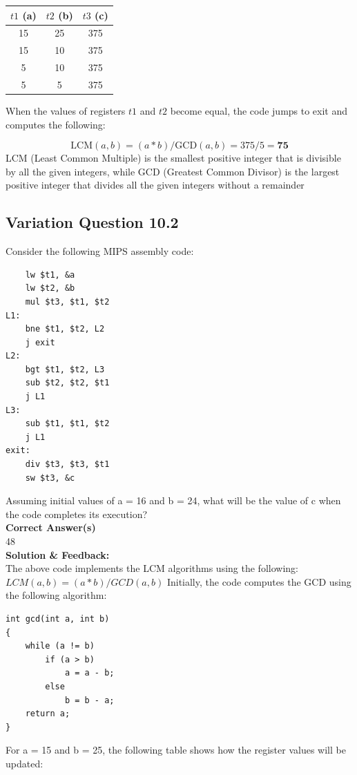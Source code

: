 \begin{center}
\begin{tabular}{|c|c|c|}
\hline
$t1$ (a) & $t2$ (b) & $t3$ (c) \\
\hline
15 & 25 & 375 \\
15 & 10 & 375 \\
5  & 10 & 375 \\
5  & 5  & 375 \\
\hline
\end{tabular}
\end{center}

When the values of registers $t1$ and $t2$ become equal, the code jumps to exit and computes the following:

\[
\text{LCM} (a, b) = (a * b) / \text{GCD} (a, b) = 375 / 5 = \mathbf{75}
\]
LCM (Least Common Multiple) is the smallest positive integer that is divisible by all the given integers, while GCD (Greatest Common Divisor) is the largest positive integer that divides all the given integers without a remainder

\subsection{Variation Question 10.2}
Consider the following MIPS assembly code:\\
\begin{lstlisting}
    lw $t1, &a
    lw $t2, &b
    mul $t3, $t1, $t2
L1:
    bne $t1, $t2, L2
    j exit
L2:
    bgt $t1, $t2, L3
    sub $t2, $t2, $t1
    j L1
L3:
    sub $t1, $t1, $t2
    j L1
exit:
    div $t3, $t3, $t1
    sw $t3, &c
\end{lstlisting}
Assuming initial values of a = 16 and b = 24, what will be the value of c when the code completes its execution? \\
\textbf{Correct Answer(s)} \\
48 \\
\textbf{Solution \& Feedback:} \\
The above code implements the LCM algorithms using the following: \\
\(LCM (a, b) = (a * b) / GCD (a, b) \)
Initially, the code computes the GCD using the following algorithm:
\begin{lstlisting}
int gcd(int a, int b)
{
    while (a != b)
        if (a > b)
            a = a - b;
        else
            b = b - a;
    return a;
}
\end{lstlisting}
For a = 15 and b = 25, the following table shows how the register values will be updated:


